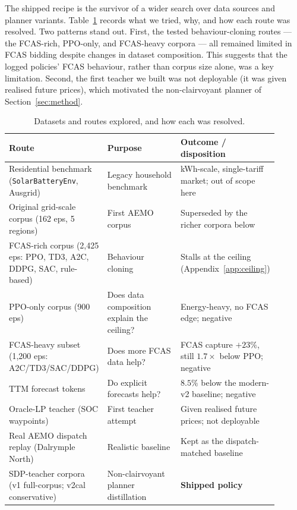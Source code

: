 \documentclass{article}
\begin{document}
The shipped recipe is the survivor of a wider search over data sources and
planner variants. Table~\ref{tab:routes} records what we tried, why, and how
each route was resolved. Two patterns stand out. First, the tested
behaviour-cloning routes --- the FCAS-rich, PPO-only, and FCAS-heavy corpora ---
all remained limited in FCAS bidding despite changes in dataset composition.
This suggests that the logged policies' FCAS behaviour, rather than corpus size
alone, was a key limitation. Second, the first teacher we built was not
deployable (it was given realised future prices), which motivated the
non-clairvoyant planner of Section~\ref{sec:method}.

\begin{table}[H]
  \centering
  \caption{Datasets and routes explored, and how each was resolved.}
  \label{tab:routes}
  \small
  \begin{tabular}{>{\raggedright\arraybackslash}p{0.32\linewidth}>{\raggedright\arraybackslash}p{0.28\linewidth}>{\raggedright\arraybackslash}p{0.30\linewidth}}
    \toprule
    Route & Purpose & Outcome / disposition \\
    \midrule
    Residential benchmark (\texttt{SolarBatteryEnv}, Ausgrid) & Legacy household
    benchmark & kWh-scale, single-tariff market; out of scope here \\
    Original grid-scale corpus (162 eps, 5 regions) & First AEMO corpus &
    Superseded by the richer corpora below \\
    FCAS-rich corpus (2{,}425 eps: PPO, TD3, A2C, DDPG, SAC, rule-based) &
    Behaviour cloning & Stalls at the ceiling (Appendix~\ref{app:ceiling}) \\
    PPO-only corpus (900 eps) & Does data composition explain the ceiling? &
    Energy-heavy, no FCAS edge; negative \\
    FCAS-heavy subset (1{,}200 eps: A2C/TD3/SAC/DDPG) & Does more FCAS data
    help? & FCAS capture $+23\%$, still $1.7\times$ below PPO; negative \\
    TTM forecast tokens & Do explicit forecasts help? & $8.5\%$ below the
    modern-v2 baseline; negative \\
    Oracle-LP teacher (SOC waypoints) & First teacher attempt & Given realised
    future prices; not deployable \\
    Real AEMO dispatch replay (Dalrymple North) & Realistic baseline & Kept as
    the dispatch-matched baseline \\
    SDP-teacher corpora (v1 full-corpus; v2cal conservative) & Non-clairvoyant
    planner distillation & \textbf{Shipped policy} \\
    \bottomrule
  \end{tabular}
\end{table}
\end{document}
